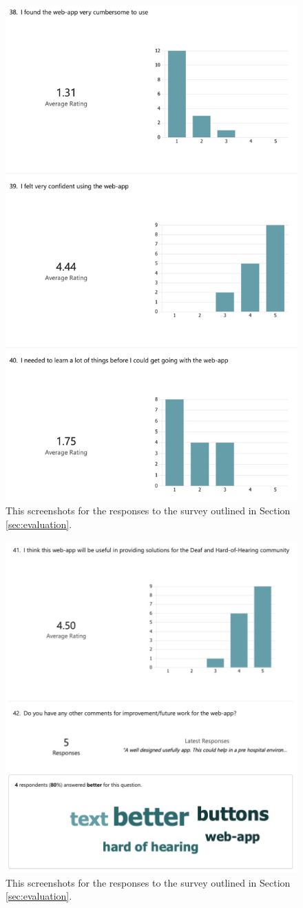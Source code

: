 \documentclass{l4proj}
\begin{document}
\begin{appendices}
\begin{figure}[H]
    \centering
    \includegraphics[width=0.75\linewidth]{dissertation/images/eval-11.jpeg}    
    \caption{This screenshots for the responses to the survey outlined in Section \ref{sec:evaluation}.}
    \label{fig:eval-survey-11} 
\end{figure}

\begin{figure}[H]
    \centering
    \includegraphics[width=0.75\linewidth]{dissertation/images/eval-12.jpeg}    
    \caption{This screenshots for the responses to the survey outlined in Section \ref{sec:evaluation}.}
    \label{fig:eval-survey-12} 
\end{figure}


\end{appendices}
\end{document}
